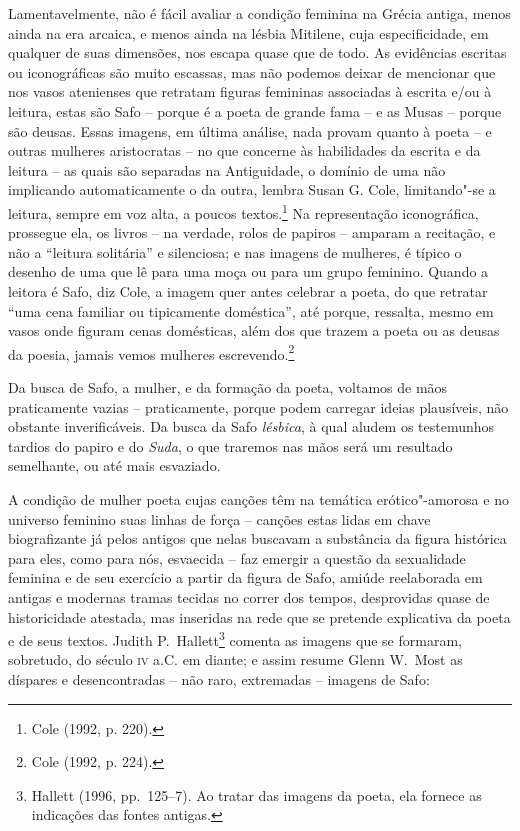 Lamentavelmente, não é fácil avaliar a condição feminina na Grécia
antiga, menos ainda na era arcaica, e menos ainda na lésbia Mitilene, cuja
especificidade, em qualquer de suas dimensões, nos escapa quase que
de todo. As evidências escritas ou iconográficas são muito
escassas, mas não podemos deixar de mencionar que nos vasos atenienses que
retratam figuras femininas associadas à escrita e/ou à leitura, estas são Safo
-- porque é a poeta de grande fama -- e as Musas -- porque são deusas.
Essas imagens, em última análise, nada provam quanto à poeta -- e outras mulheres
aristocratas -- no que concerne às habilidades da escrita e da leitura -- as
quais são separadas na Antiguidade, o domínio de uma não implicando
automaticamente o da outra, lembra Susan G. Cole, limitando"-se a
leitura, sempre em voz alta, a poucos textos.\footnote{ Cole (1992, p. 220).} Na representação iconográfica,
prossegue ela, os livros -- na verdade, rolos de papiros -- amparam a
recitação, e não a “leitura solitária” e silenciosa; e nas imagens de mulheres,
é típico o desenho de uma que lê para uma moça ou para um grupo feminino.
Quando a leitora é Safo, diz Cole, a imagem quer antes celebrar a poeta, do que
retratar “uma cena familiar ou tipicamente doméstica”, até porque, ressalta,
mesmo em vasos onde figuram cenas domésticas, além dos que trazem a poeta ou as
deusas da poesia, jamais vemos mulheres escrevendo.\footnote{ Cole (1992, p. 224).}

Da busca de Safo, a mulher, e da formação da poeta, voltamos de mãos
praticamente vazias -- praticamente, porque podem carregar ideias plausíveis,
não obstante inverificáveis. Da busca da Safo \textit{lésbica}, à qual
aludem os testemunhos tardios do papiro e do \textit{Suda}, o que traremos nas
mãos será um resultado semelhante, ou até mais esvaziado.

A condição de mulher poeta cujas canções têm na temática erótico"-amorosa e no
universo feminino suas linhas de força -- canções estas lidas em chave
biografizante já pelos antigos que nelas buscavam a substância da figura
histórica para eles, como para nós, esvaecida -- faz emergir a questão da
sexualidade feminina e de seu exercício a partir da figura de Safo,
amiúde reelaborada em antigas e modernas tramas tecidas no correr dos
tempos, desprovidas quase de historicidade atestada, mas
inseridas na rede que se pretende explicativa da poeta e de seus textos. Judith
P.~Hallett\footnote{ Hallett (1996, pp.~125--7). Ao tratar das
imagens da poeta, ela fornece as indicações das fontes antigas.} comenta as
imagens que se formaram, sobretudo, do século \textsc{iv} a.C. em diante; e assim resume
Glenn W.~Most as díspares e desencontradas -- não raro,
extremadas -- imagens de Safo: 

